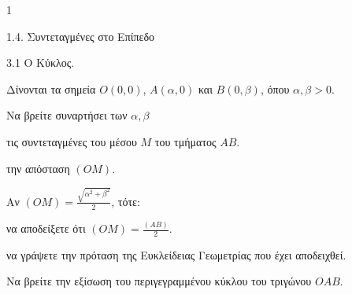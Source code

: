 \begin{ylh}{1}
    \item 1.4. Συντεταγμένες στο Επίπεδο
    \item 3.1 Ο Κύκλος.
\end{ylh}
Δίνονται τα σημεία $O(0,0)$, $A(\alpha,0)$ και $B(0,\beta)$, όπου $\alpha,\beta > 0$.
\begin{alist}
\item Να βρείτε συναρτήσει των $\alpha,\beta$
    \begin{rlist}
    \item τις συντεταγμένες του μέσου $M$ του τμήματος $AB$. 
    \item την απόσταση $(OM)$. 
    \end{rlist}
\item Αν $(OM) = \frac{\sqrt{\alpha^2 + \beta^2}}{2}$, τότε:
    \begin{rlist}
    \item να αποδείξετε ότι $(OM) = \frac{(AB)}{2}$. 
    \item να γράψετε την πρόταση της Ευκλείδειας Γεωμετρίας που έχει αποδειχθεί. 
    \end{rlist}
\item Να βρείτε την εξίσωση του περιγεγραμμένου κύκλου του τριγώνου $OAB$. 
\end{alist}